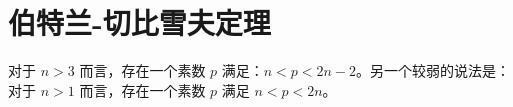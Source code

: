 \section{伯特兰-切比雪夫定理}
对于 $n > 3$ 而言，存在一个素数 $p$ 满足：$n < p < 2n - 2$。另一个较弱的说法是：
对于 $n > 1$ 而言，存在一个素数 $p$ 满足 $n < p < 2n$。
